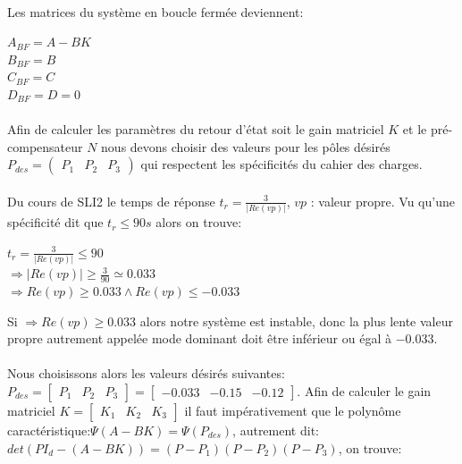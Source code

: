		\paragraph{} Les matrices du système en boucle fermée deviennent:\\
		
		\begin{center}
			
			$A_{BF}=A-BK$\\
			 $B_{BF}=B$\\
			 $C_{BF}=C$\\
			 $D_{BF}=D=0$			
			
		\end{center}				
		
		\paragraph{}
			Afin de calculer les paramètres du retour d'état soit le gain matriciel $K$ et le pré-compensateur $N$ nous devons choisir des valeurs pour les pôles désirés $P_{des}=\begin{pmatrix} P_1 & P_2 & P_3 \end{pmatrix} $ qui respectent les spécificités du cahier des charges.\\
		
		\paragraph{} Du cours de SLI2 le temps de réponse $t_r =\frac{3}{|Re(vp)|} $, $vp$ : valeur propre. Vu qu'une spécificité dit que $t_r \leqslant 90s$ alors on trouve:\\
		
		\begin{center}
				
				$t_r =\frac{3}{|Re(vp)|}\leqslant 90 $\\[1cm]
				$\Rightarrow|Re(vp)| \geqslant \frac{3}{90} \simeq 0.033 $\\[1cm]
				$\Rightarrow Re(vp) \geqslant 0.033 \wedge Re(vp) \leqslant -0.033$
		\end{center}
		Si $\Rightarrow Re(vp) \geqslant 0.033$ alors notre système est instable, donc la plus lente valeur propre autrement appelée mode dominant doit être inférieur ou égal à $-0.033$.\\\\
		
		Nous choisissons alors les valeurs désirés suivantes: $P_{des}= \begin{bmatrix} P_1&P_2&P_3\end{bmatrix}=\begin{bmatrix} -0.033&-0.15&-0.12 \end{bmatrix} $. Afin de calculer le gain matriciel $K=\begin{bmatrix} K_1 & K_2 & K_3 \end{bmatrix}$ il faut impérativement que le polynôme caractéristique:$ \Psi(A-BK)= \Psi(P_{des})$, autrement dit: $det(PI_d-(A-BK))=(P-P_1)(P-P_2)(P-P_3)$, on trouve:\\
		
